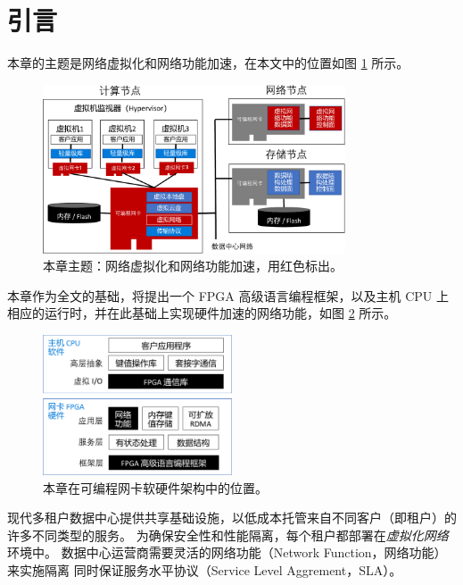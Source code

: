 \section{引言}

本章的主题是网络虚拟化和网络功能加速，在本文中的位置如图 \ref{clicknp:fig:sys-arch} 所示。

\begin{figure}[htbp]
	\centering
	\includegraphics[width=0.8\textwidth]{image/sys_arch.pdf}
	\caption{本章主题：网络虚拟化和网络功能加速，用红色标出。}
	\label{clicknp:fig:sys-arch}
\end{figure}

本章作为全文的基础，将提出一个 FPGA 高级语言编程框架，以及主机 CPU 上相应的运行时，并在此基础上实现硬件加速的网络功能，如图 \ref{clicknp:fig:sw-hw-codesign} 所示。

\begin{figure}[htbp]
	\centering
	\includegraphics[width=0.5\textwidth]{image/sw_hw_codesign.pdf}
	\caption{本章在可编程网卡软硬件架构中的位置。}
	\label{clicknp:fig:sw-hw-codesign}
\end{figure}

现代多租户数据中心提供共享基础设施，以低成本托管来自不同客户（即租户）的许多不同类型的服务。
为确保安全性和性能隔离，每个租户都部署在\textit{虚拟化网络}环境中。
数据中心运营商需要灵活的网络功能（Network Function，网络功能）来实施隔离
同时保证服务水平协议（Service Level Aggrement，SLA）。

